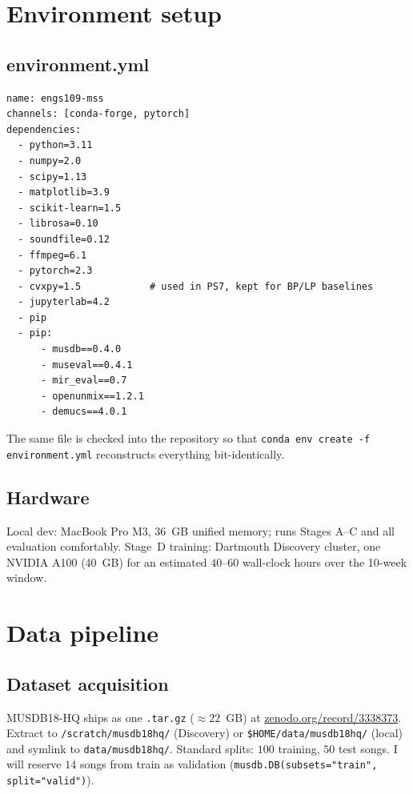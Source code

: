 \documentclass[10pt]{article}
\begin{document}
\section{Environment setup}
\subsection*{environment.yml}
\begin{lstlisting}[language={}]
name: engs109-mss
channels: [conda-forge, pytorch]
dependencies:
  - python=3.11
  - numpy=2.0
  - scipy=1.13
  - matplotlib=3.9
  - scikit-learn=1.5
  - librosa=0.10
  - soundfile=0.12
  - ffmpeg=6.1
  - pytorch=2.3
  - cvxpy=1.5            # used in PS7, kept for BP/LP baselines
  - jupyterlab=4.2
  - pip
  - pip:
      - musdb==0.4.0
      - museval==0.4.1
      - mir_eval==0.7
      - openunmix==1.2.1
      - demucs==4.0.1
\end{lstlisting}
The same file is checked into the repository so that \texttt{conda env
create -f environment.yml} reconstructs everything bit-identically.

\subsection*{Hardware}
Local dev: MacBook Pro M3, 36~GB unified memory; runs Stages A--C and
all evaluation comfortably.  Stage~D training: Dartmouth Discovery
cluster, one NVIDIA A100 (40~GB) for an estimated $40$--$60$ wall-clock
hours over the 10-week window.

\section{Data pipeline}
\subsection*{Dataset acquisition}
MUSDB18-HQ ships as one \texttt{.tar.gz} ($\approx\!22$~GB) at
\href{https://zenodo.org/record/3338373}{zenodo.org/record/3338373}.
Extract to \texttt{/scratch/musdb18hq/} (Discovery) or
\texttt{\$HOME/data/musdb18hq/} (local) and symlink to
\texttt{data/musdb18hq/}.  Standard splits: $100$ training, $50$ test
songs.  I will reserve $14$ songs from train as validation
(\texttt{musdb.DB(subsets="train", split="valid")}).
\end{document}
